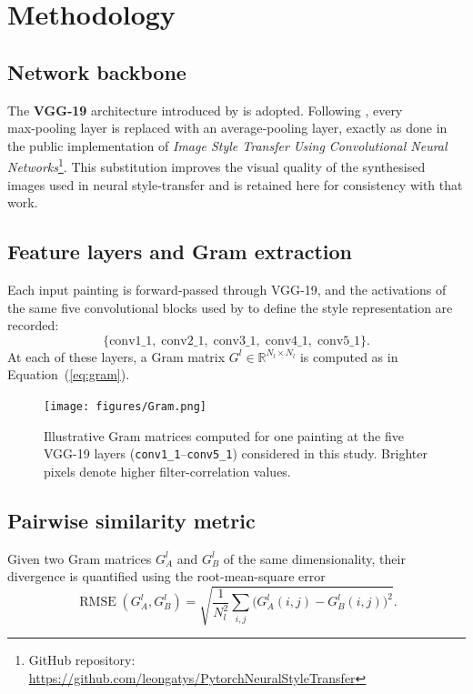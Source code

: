 \documentclass[a4paper,11pt]{article}
\begin{document}
\section{Methodology}

\subsection{Network backbone}
The \textbf{VGG‑19} architecture introduced by \textcite{simon2014vgg} is adopted. Following \textcite{gatys2016}, every max‑pooling layer is replaced with an average‑pooling layer, exactly as done in the public implementation of \emph{Image Style Transfer Using Convolutional Neural Networks}\footnote{GitHub repository: \url{https://github.com/leongatys/PytorchNeuralStyleTransfer}}. This substitution improves the visual quality of the synthesised images used in neural style‑transfer and is retained here for consistency with that work.

\subsection{Feature layers and Gram extraction}
Each input painting is forward‑passed through VGG‑19, and the activations of the same five convolutional blocks used by \textcite{gatys2016} to define the style representation are recorded:
\begin{equation*}
    \{\text{conv1\_1},\;\text{conv2\_1},\;\text{conv3\_1},\;\text{conv4\_1},\;\text{conv5\_1}\}.
\end{equation*}
At each of these layers, a Gram matrix $G^{l}\in\mathbb{R}^{N_{l}\times N_{l}}$ is computed as in Equation~(\ref{eq:gram}).

\begin{figure}[htbp]
    \centering
    \texttt{[image: figures/Gram.png]}
    \caption{Illustrative Gram matrices computed for one painting at the five VGG-19 layers (\texttt{conv1\_1}–\texttt{conv5\_1}) considered in this study. Brighter pixels denote higher filter-correlation values.}
    \label{fig:gram_example}
\end{figure}

\subsection{Pairwise similarity metric}
Given two Gram matrices $G^{l}_{A}$ and $G^{l}_{B}$ of the same dimensionality, their divergence is quantified using the root-mean-square error
\begin{equation}
    \operatorname{RMSE}(G^{l}_{A},G^{l}_{B}) = \sqrt{ \frac{1}{N_{l}^{2}} \sum_{i,j} \bigl(G^{l}_{A}(i,j)-G^{l}_{B}(i,j)\bigr)^{2} }.
\end{equation}
\end{document}
